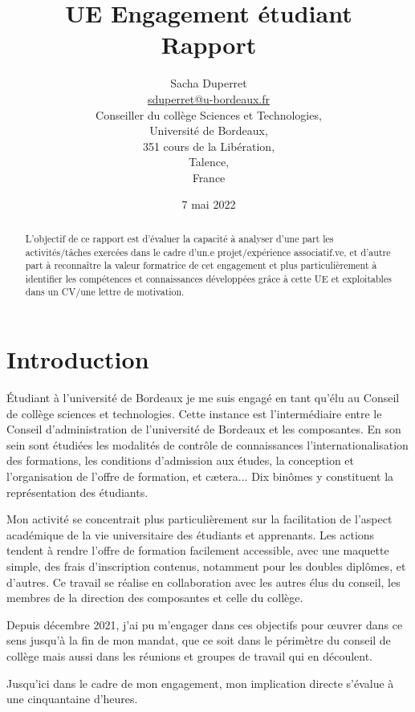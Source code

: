\documentclass{article}
\title{{\huge UE Engagement étudiant\\Rapport}}
\author{$ $\\{\LARGE Sacha Duperret}\\ $ $\\ \href{mailto:sduperret@u-bordeaux.fr}{sduperret@u-bordeaux.fr}\\Conseiller du collège Sciences et Technologies,\\Université de Bordeaux,\\351 cours de la Libération,\\Talence,\\France}
\date{7 mai 2022}
\begin{document}
\maketitle

\vspace{20pt}

\tableofcontents

\vspace{50pt}

\begin{abstract}
L'objectif de ce rapport est d'évaluer la capacité à analyser d’une part les activités/tâches exercées dans le cadre d'un.e projet/expérience associatif.ve, et d’autre part à reconnaître la valeur formatrice de cet engagement et plus particulièrement à identifier les compétences et connaissances développées grâce à cette UE et exploitables dans un CV/une lettre de motivation.
\end{abstract}

\newpage \section*{Introduction}

Étudiant à l'université de Bordeaux je me suis engagé en tant qu'élu au Conseil de collège sciences et technologies. 
Cette instance est l’intermédiaire entre le Conseil d'administration de l'université de Bordeaux et les composantes. 
En son sein sont étudiées les modalités de contrôle de connaissances l’internationalisation des formations, les conditions d'admission aux études, la conception et l'organisation de l'offre de formation, et cætera... 
Dix binômes y constituent la représentation des étudiants. 

Mon activité se concentrait plus particulièrement sur la facilitation de l'aspect académique de la vie universitaire des étudiants et apprenants. 
Les actions tendent à rendre l’offre de formation facilement accessible, avec une maquette simple, des frais d'inscription contenus, notamment pour les doubles diplômes, et d'autres. 
Ce travail se réalise en collaboration avec les autres élus du conseil, les membres de la direction des composantes et celle du collège.

Depuis décembre 2021, j’ai pu m’engager dans ces objectifs pour œuvrer dans ce sens jusqu’à la fin de mon mandat, que ce soit dans le périmètre du conseil de collège mais aussi dans les réunions et groupes de travail qui en découlent. 

\newpage
Jusqu'ici dans le cadre de mon engagement, mon implication directe s’évalue à une cinquantaine d'heures. 
\end{document}
